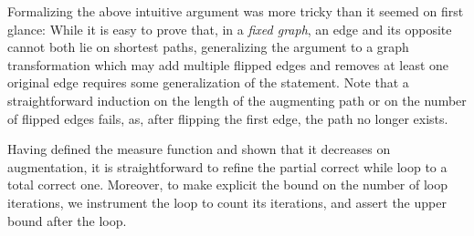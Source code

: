 \documentclass{llncs}
\begin{document}
  Formalizing the above intuitive argument was more tricky than it seemed on first glance:
  While it is easy to prove that, in a \emph{fixed graph}, an edge and its opposite cannot both lie on shortest paths, generalizing the argument
  to a graph transformation which may add multiple flipped edges and removes at least one original edge requires some generalization of the statement.
  Note that a straightforward induction on the length of the augmenting path or on the number of flipped edges fails, as, after flipping the first 
  edge, the path no longer exists.
  
%   
%   
%   
  
  Having defined the measure function and shown that it decreases on augmentation, it is straightforward to refine the partial correct while loop to a total correct one. Moreover, to make explicit the bound on the number of loop iterations, we instrument the loop to count its iterations, and assert the upper bound after the loop.
\end{document}

